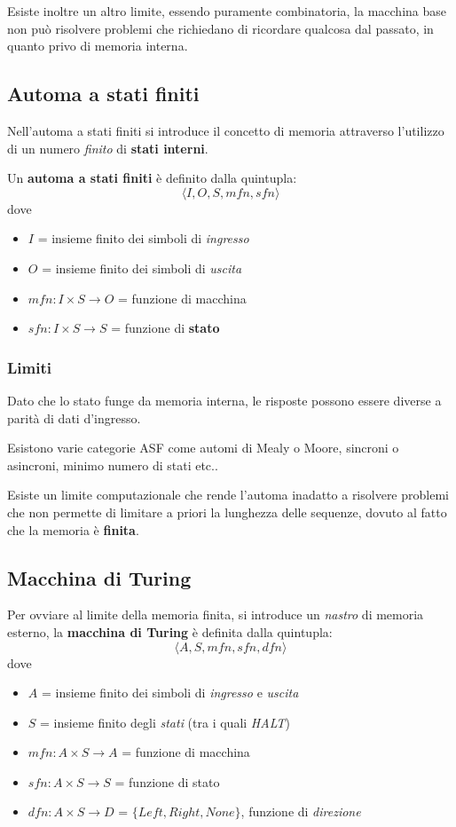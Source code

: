Esiste inoltre un altro limite, essendo puramente combinatoria, la macchina base non può risolvere problemi che richiedano di ricordare qualcosa dal passato, in quanto privo di memoria interna.

\subsection{Automa a stati finiti}
Nell'automa a stati finiti si introduce il concetto di memoria attraverso l'utilizzo di un numero \textit{finito} di \textbf{stati interni}.

Un \textbf{automa a stati finiti} è definito dalla quintupla:
\begin{equation*}
    \langle I, O, S, mfn, sfn\rangle
\end{equation*}
dove
\begin{itemize}
    \item $I$ = insieme finito dei simboli di \textit{ingresso}
    \item $O$ = insieme finito dei simboli di \textit{uscita}
    \item $mfn: I \times S \rightarrow O$ = funzione di macchina
    \item $sfn: I \times S \rightarrow S$ = funzione di \textbf{stato}
\end{itemize}

\subsubsection{Limiti}
Dato che lo stato funge da memoria interna, le risposte possono essere diverse a parità di dati d'ingresso.

Esistono varie categorie ASF come automi di Mealy o Moore, sincroni o asincroni, minimo numero di stati etc..

Esiste un limite computazionale che rende l'automa inadatto a risolvere problemi che non permette di limitare a priori la lunghezza delle sequenze, dovuto al fatto che la memoria è \textbf{finita}.

\subsection{Macchina di Turing}
Per ovviare al limite della memoria finita, si introduce un \textit{nastro} di memoria esterno, la \textbf{macchina di Turing} è definita dalla quintupla:
\begin{equation*}
    \langle A, S, mfn, sfn, dfn\rangle
\end{equation*}
dove
\begin{itemize}
    \item $A$ = insieme finito dei simboli di \textit{ingresso} e \textit{uscita}
    \item $S$ = insieme finito degli \textit{stati} (tra i quali \textit{HALT})
    \item $mfn: A \times S \rightarrow A$ = funzione di macchina
    \item $sfn: A \times S \rightarrow S$ = funzione di stato
    \item $dfn: A \times S \rightarrow D$ = $\{Left, Right, None\}$, funzione di \textit{direzione}
\end{itemize}

